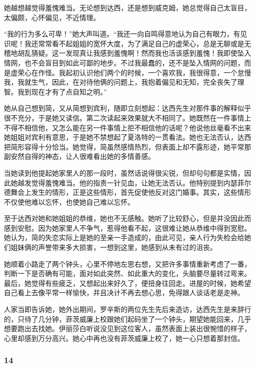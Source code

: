 \par 她越想越觉得羞愧难当。无论想到达西，还是想到威克姆，她总觉得自己太盲目，太偏颇，心怀偏见，不近情理。
\par “我的行为多么可卑！”她大声叫道。“我还一向自鸣得意地认为自己有眼力，有见识呢！我还常常看不起姐姐的宽怀大度，为了满足自己的虚荣心，总是无聊或是无稽地胡乱猜疑。这一发现真让我感到羞愧啊！然而我也活该感到羞愧！我即使坠入情网，也不会盲目到如此可鄙的地步。不过我最蠢的，还不是坠入情网的问题，而是虚荣心在作怪。我起初认识他们两个的时候，一个喜欢我，我很得意，一个怠慢我，我就生气，因此，在对待他俩的问题上，我抱着偏见和无知，完全丧失了理智。我到现在才有了点自知之明。”
\par 她从自己想到简，又从简想到宾利，随即立刻想起：达西先生对那件事的解释似乎很不充分，于是她又读信。第二次读起来效果就大不相同了。她既然在一件事情上不得不相信他，又怎么能在另一件事情上拒不相信他的话呢？他说他丝毫看不出来她姐姐对宾利有意思，于是她不禁想起了夏洛特的一贯看法。她也无法否认，达西把简形容得十分恰当。她觉得，简虽然感情热烈，但表面上却不露形迹，她平常那副安然自得的神态，让人很难看出她的多情善感。
\par 当她读到他提起她家里人的那一段时，虽然话说得很尖锐，但却句句都是实情，因此她越发觉得羞愧难当。他的指责一针见血，让她无法否认。他特别提到内瑟菲尔德舞会上发生的情形，正是这些情形，首先促使他反对这门婚事。其实，这些情形不仅使他难以忘怀，也使她自己难以忘怀。
\par 至于达西对她和她姐姐的恭维，她也不无感触。她听了比较舒心，但是并没因此而感到安慰。因为她家里人不争气，惹得他看不起，这很难让她从恭维中得到宽慰。她认为，简的失恋实际上是她的至亲一手造成的，由此可见，亲人行为失检会给她们姐妹俩的声誉带来多大损害，一想到这里，她感到从未有过的沮丧。
\par 她顺着小路走了两个钟头，心里不停地左思右想，又把许多事情重新考虑了一番，判断一下是否确有可能，面对如此突然、如此重大的变化，头脑要尽量转过弯来。最后，她觉得有些疲乏，又想起出来好久了，便扭身往回走。进屋的时候，她希望自己看上去像平常一样愉快，并且决计不再去想心思，免得跟人谈话老是走神。
\par 人家当即告诉她，她外出期间，罗辛斯的两位先生先后来造访，达西先生是来辞行的，只待了几分钟，菲茨威廉上校跟她们起码坐了一个钟头，期望她能回来，几乎想要跑出去找她。伊丽莎白听说没见到这位客人，虽然表面上装出很惋惜的样子，心里却感到万分高兴。她心中再也没有菲茨威廉上校了，她一心只想着那封信。



\subsubsection*{14}


